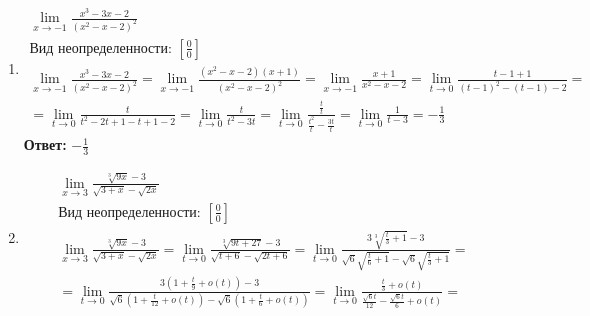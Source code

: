 \begin{enumerate}
    \item
          \begin{gather*}
              \lim_{x\rightarrow -1}{\frac
                  {x^3-3x-2}
                  {(x^2-x-2)^2}} \\
              \text{Вид неопределенности: }{\left[\frac{0}{0}\right]} \\
              \lim_{x\rightarrow -1}{\frac
                  {x^3-3x-2}
                  {(x^2-x-2)^2}} =
              \lim_{x\rightarrow -1}{\frac
                  {(x^2-x-2)(x+1)}
                  {(x^2-x-2)^2}} =
              \lim_{x\rightarrow -1}{\frac
                  {x+1}
                  {x^2-x-2}} =
              \lim_{t\rightarrow 0}{\frac
                  {t-1+1}
                  {(t-1)^2-(t-1)-2}} = \\ =
              \lim_{t\rightarrow 0}{\frac
                  {t}
                  {t^2-2t+1-t+1-2}} =
              \lim_{t\rightarrow 0}{\frac
                  {t}
                  {t^2-3t}} =
              \lim_{t\rightarrow 0}{\frac
                  {\frac{t}{t}}
                  {\frac{t^2}{t}-\frac{3t}{t}}} =
              \lim_{t\rightarrow 0}{\frac
                  {1}
                  {t-3}} =
              -\frac{1}{3}
          \end{gather*}
          {\bf Ответ:} $-\frac{1}{3}$
    \item
          \begin{gather*}
              \lim_{x\rightarrow 3}{\frac
                  {\sqrt[3]{9x}-3}
                  {\sqrt{3+x}-\sqrt{2x}}} \\
              \text{Вид неопределенности: }{\left[\frac{0}{0}\right]} \\
              \lim_{x\rightarrow 3}{\frac
                  {\sqrt[3]{9x}-3}
                  {\sqrt{3+x}-\sqrt{2x}}} =
              \lim_{t\rightarrow 0}{\frac
                  {\sqrt[3]{9t+27}-3}
                  {\sqrt{t+6}-\sqrt{2t+6}}} =
              \lim_{t\rightarrow 0}{\frac
                  {3\sqrt[3]{\frac{t}{3}+1}-3}
                  {\sqrt{6}\sqrt{\frac{t}{6}+1}-\sqrt{6}\sqrt{\frac{t}{3}+1}}} = \\
              = \lim_{t\rightarrow 0}{\frac
              {3(1+\frac{t}{9}+o(t))-3}
              {\sqrt{6}(1+\frac{t}{12}+o(t))-\sqrt{6}(1+\frac{t}{6}+o(t))}} =
              \lim_{t\rightarrow 0}{\frac
                  {\frac{t}{3}+o(t)}
                  {\frac{\sqrt{6}t}{12}-\frac{\sqrt{6}t}{6}+o(t)}} =

\end{gather*}
\end{enumerate}
